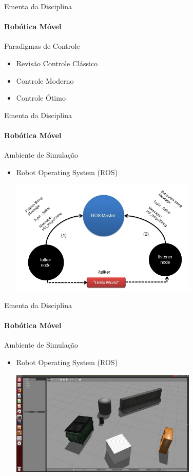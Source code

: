 \documentclass{beamer}
\begin{document}
\begin{frame}[c]{Ementa da Disciplina}
	\framesubtitle{Robótica Móvel}
	\begin{block}{Paradigmas de Controle}
	\end{block}
	\begin{itemize}
		\item Revisão Controle Clássico
        \item Controle Moderno
        \item Controle Ótimo
	\end{itemize}
\end{frame}


\begin{frame}[t]{Ementa da Disciplina}
	\framesubtitle{Robótica Móvel}
	\begin{block}{Ambiente de Simulação}
	\end{block}
	\begin{itemize}
		\item  Robot Operating System (ROS)
		\begin{center}
			\includegraphics[width=0.7\textwidth]{./images/ros_msgs.png}	
		\end{center}
	\end{itemize}
\end{frame}



\begin{frame}[t]{Ementa da Disciplina}
	\framesubtitle{Robótica Móvel}
	\begin{block}{Ambiente de Simulação}
	\end{block}

	\begin{itemize}
		\item  Robot Operating System (ROS)
		\begin{center}
			\includegraphics[width=0.7\textwidth]{./images/ros_example.png}	
		\end{center}
	\end{itemize}
\end{frame}
\end{document}
